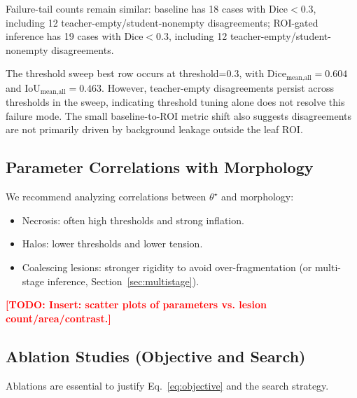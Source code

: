 \documentclass[journal]{IEEEtran}
\newcommand{\TODO}[1]{\textcolor{red}{\textbf{[TODO: #1]}}}
\begin{document}
Failure-tail counts remain similar: baseline has 18 cases with Dice$<0.3$, including 12 teacher-empty/student-nonempty disagreements; ROI-gated inference has 19 cases with Dice$<0.3$, including 12 teacher-empty/student-nonempty disagreements.

The threshold sweep best row occurs at threshold=0.3, with $\text{Dice}_{\text{mean,all}}=0.604$ and $\text{IoU}_{\text{mean,all}}=0.463$. However, teacher-empty disagreements persist across thresholds in the sweep, indicating threshold tuning alone does not resolve this failure mode. The small baseline-to-ROI metric shift also suggests disagreements are not primarily driven by background leakage outside the leaf ROI.

\subsection{Parameter Correlations with Morphology}
We recommend analyzing correlations between $\theta^\star$ and morphology:
\begin{itemize}
    \item Necrosis: often high thresholds and strong inflation.
    \item Halos: lower thresholds and lower tension.
    \item Coalescing lesions: stronger rigidity to avoid over-fragmentation (or multi-stage inference, Section~\ref{sec:multistage}).
\end{itemize}
\TODO{Insert: scatter plots of parameters vs. lesion count/area/contrast.}

\subsection{Ablation Studies (Objective and Search)}
\label{sec:ablations}
Ablations are essential to justify Eq.~\eqref{eq:objective} and the search strategy.
\end{document}
